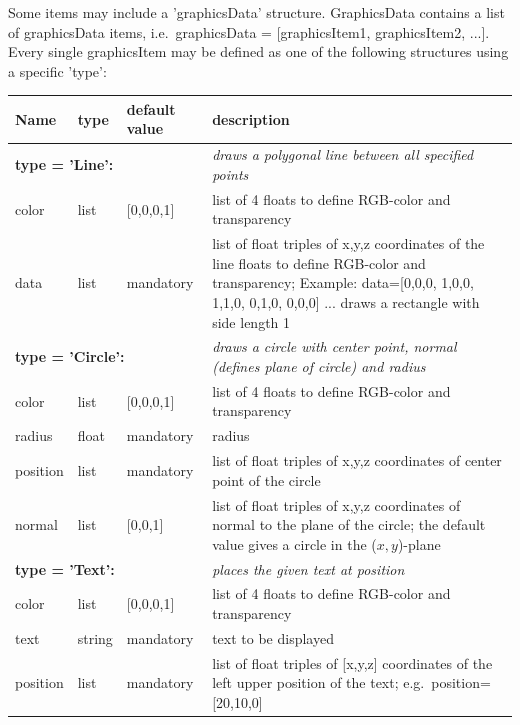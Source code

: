 \documentclass[11pt,a4paper]{book} %
\begin{document}
Some items may include a 'graphicsData' structure. GraphicsData contains a list of graphicsData items, i.e.\ graphicsData = [graphicsItem1, graphicsItem2, ...]. Every single graphicsItem may be defined as one of the following structures using a specific 'type':
\begin{center}
  \footnotesize
  \begin{longtable}{| p{3cm} | p{2cm} | p{3cm} | p{7.5cm} |} 
	\hline
  \bf Name & \bf type & \bf default value & \bf description \\ \hline
%
	\multicolumn{3}{l}{\parbox{8cm}{\bf type = 'Line': }} & \multicolumn{1}{l}{\parbox{7.5cm}{\it draws a polygonal line between all specified points}}\\ \hline
  color & list & [0,0,0,1] & list of 4 floats to define RGB-color and transparency\\ \hline
  data & list &  mandatory & list of float triples of x,y,z coordinates of the line floats to define RGB-color and transparency; Example: data=[0,0,0, 1,0,0, 1,1,0, 0,1,0, 0,0,0] ... draws a rectangle with side length 1\\ \hline
%
	\multicolumn{3}{l}{\parbox{8cm}{\bf type = 'Circle': }} & \multicolumn{1}{l}{\parbox{7.5cm}{\it draws a circle with center point, normal (defines plane of circle) and radius}}\\ \hline
  color & list & [0,0,0,1] & list of 4 floats to define RGB-color and transparency\\ \hline
  radius & float & mandatory & radius\\ \hline
  position & list & mandatory & list of float triples of x,y,z coordinates of center point of the circle\\ \hline
  normal & list & [0,0,1] & list of float triples of x,y,z coordinates of normal to the plane of the circle; the default value gives a circle in the ($x,y$)-plane\\ \hline
	\multicolumn{3}{l}{\parbox{8cm}{\bf type = 'Text': }} & \multicolumn{1}{l}{\parbox{7.5cm}{\it places the given text at position}}\\ \hline
  color & list & [0,0,0,1] & list of 4 floats to define RGB-color and transparency\\ \hline
  text & string & mandatory & text to be displayed\\ \hline
  position & list & mandatory & list of float triples of [x,y,z] coordinates of the left upper position of the text; e.g.\ position=[20,10,0] \\ \hline

\end{longtable}
\end{center}
\end{document}
